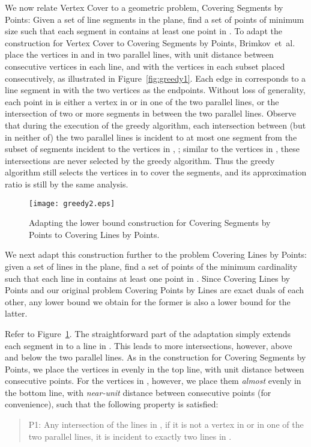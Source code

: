 \documentclass[letterpaper,11pt]{article}
\def\etal{{et~al.}}
\begin{document}
We now relate {\sc Vertex Cover} to a geometric problem, 
{\sc Covering Segments by Points}:
Given a set  of  line segments in the plane, find a set  of
points of minimum size such that each segment in  contains at least one point in . 
To adapt the construction for {\sc Vertex Cover} to {\sc Covering Segments by Points},
Brimkov~\etal~\cite{BLWM12} place the vertices in  and  in two parallel
lines, with unit distance between consecutive vertices in each line,
and with the vertices in each subset  placed consecutively,
as illustrated in Figure~\ref{fig:greedy1}.
Each edge in  corresponds to
a line segment in  with the two vertices as the endpoints.
Without loss of generality,
each point in  is either a vertex in  or 
in one of the two parallel lines,
or the intersection of two or more segments in 
between the two parallel lines.
Observe that during the execution of the greedy algorithm,
each intersection between (but in neither of) the two parallel lines
is incident to at most one segment from the subset of segments
incident to the vertices in , ;
similar to the vertices in , these intersections are never selected by
the greedy algorithm.
Thus the greedy algorithm still selects the vertices in 
to cover the segments,
and its approximation ratio is still  by the same analysis.
\begin{figure}[htb]
\centering\texttt{[image: greedy2.eps]}
\caption{Adapting the lower bound construction for {\sc Covering Segments by Points} 
to {\sc Covering Lines by Points}.}
\label{fig:greedy2}
\end{figure}

We next adapt this construction further to the problem
{\sc Covering Lines by Points}:
given a set  of  lines in the plane,
find a set  of points of the minimum cardinality such that
each line in  contains at least one point in .
Since {\sc Covering Lines by Points} and 
our original problem {\sc Covering Points by Lines} 
are exact duals of each other, any lower bound we obtain for the
former is also a lower bound for the latter.

Refer to Figure~\ref{fig:greedy2}.
The straightforward part of the adaptation simply extends each segment
in  to a line in . This leads to more intersections, however,
above and below the two parallel lines.
As in the construction for {\sc Covering Segments by Points},
we place the vertices in  evenly in the top line,
with unit distance between consecutive points.
For the vertices in , however, we place them \emph{almost} evenly in
the bottom line, with \emph{near-unit} distance between consecutive
points (for convenience),
such that the following property is satisfied:
\begin{quote}
P1: Any intersection of the lines in ,
if it is not a vertex in  or  in one of the two parallel lines,
it is incident to exactly two lines in .
\end{quote}
\end{document}
